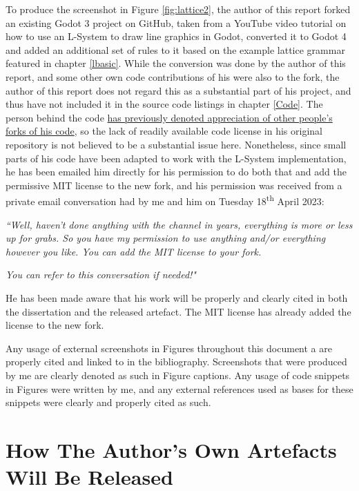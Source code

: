 To produce the screenshot in Figure \ref{fig:lattice2}, the author of this report forked an existing Godot 3 project on GitHub\cite{codatGD3LSystemGH}, taken from a YouTube video tutorial on how to use an L-System to draw line graphics in Godot\cite{codatGD3LSystemYT}, converted it to Godot 4 and added an additional set of rules to it based on the example lattice grammar featured in chapter \ref{lbasic}.\cite{codatGD4LSystemGH} While the conversion was done by the author of this report, and some other own code contributions of his were also to the fork, the author of this report does not regard this as a substantial part of his project, and thus have not included it in the source code listings in chapter \ref{Code}. The person behind the code \hyperlink{https://www.youtube.com/watch?v=eY9XkJERiG0&lc=UgwXjzr7jheuC9hH18h4AaABAg}{has previously denoted appreciation of other people's forks of his code}, so the lack of readily available code license in his original repository is not believed to be a substantial issue here. Nonetheless, since small parts of his code have been adapted to work with the L-System implementation, he has been emailed him directly for his permission to do both that and add the permissive MIT license to the new fork, and his permission was received from a private email conversation had by me and him on Tuesday 18\textsuperscript{th} April 2023:

\textit{``Well, haven't done anything with the channel in years, everything is more or less up for grabs. So you have my permission to use anything and/or everything however you like. You can add the MIT license to your fork.}

\textit{You can refer to this conversation if needed!"}

He has been made aware that his work will be properly and clearly cited in both the dissertation and the released artefact. The MIT license has already added the license to the new fork.\cite{codatGD4LSystemGH}

Any usage of external screenshots in Figures throughout this document a are properly cited and linked to in the bibliography. Screenshots that were produced by me are clearly denoted as such in Figure captions. Any usage of code snippets in Figures were written by me, and any external references used as bases for these snippets were clearly and properly cited as such.

\section{How The Author's Own Artefacts Will Be Released} \label{howrelease}

